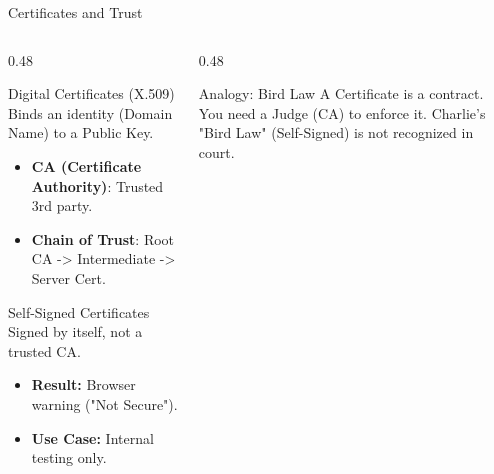 \documentclass[aspectratio=169]{beamer}  %
\begin{document}
\begin{frame}{Certificates and Trust}
    \begin{columns}[T]
        \begin{column}{0.48\textwidth}
            \begin{block}{Digital Certificates (X.509)}
                \small
                Binds an identity (Domain Name) to a Public Key.
                \begin{itemize}
                    \item \textbf{CA (Certificate Authority)}: Trusted 3rd party.
                    \item \textbf{Chain of Trust}: Root CA -> Intermediate -> Server Cert.
                \end{itemize}
            \end{block}
            \begin{alertblock}{Self-Signed Certificates}
                \small
                Signed by itself, not a trusted CA.
                \begin{itemize}
                    \item \textbf{Result:} Browser warning ("Not Secure").
                    \item \textbf{Use Case:} Internal testing only.
                \end{itemize}
            \end{alertblock}
        \end{column}
        \begin{column}{0.48\textwidth}
            \begin{center}
            \end{center}
            \begin{exampleblock}{Analogy: Bird Law}
                \footnotesize
                A Certificate is a contract. You need a Judge (CA) to enforce it. Charlie's "Bird Law" (Self-Signed) is not recognized in court.
            \end{exampleblock}
        \end{column}
    \end{columns}
\end{frame}
\end{document}
